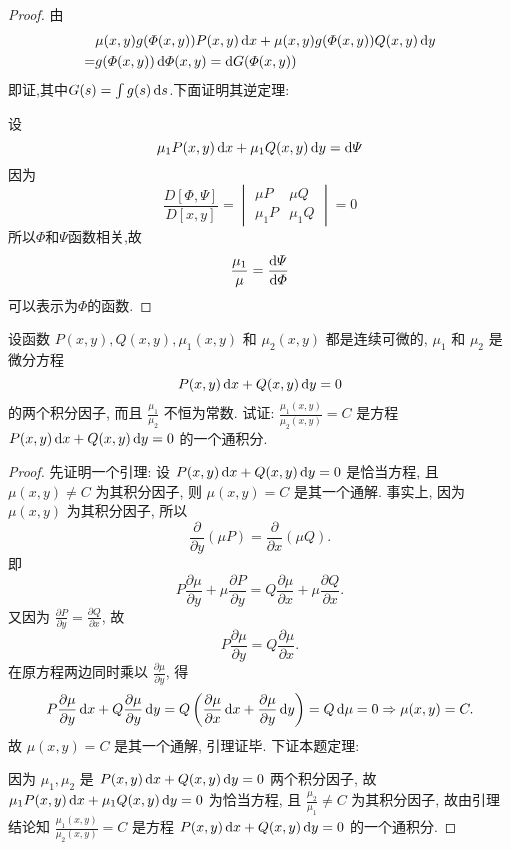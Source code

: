 \begin{proof}
由
\[\begin{split}
&\mu(x,y)g(\varPhi(x,y))P(x,y)\mathop{}\!\mathrm{d} x+\mu(x,y)g(\varPhi(x,y))Q(x,y)\mathop{}\!\mathrm{d} y\\
=&g(\varPhi(x,y))\mathop{}\!\mathrm{d}\varPhi(x,y)=\mathop{}\!\mathrm{d} G(\varPhi(x,y))
\end{split}\]
即证,其中$G(s)=\int g(s)\mathop{}\!\mathrm{d} s$.下面证明其逆定理:

设
\[\mu_1P(x,y)\mathop{}\!\mathrm{d} x+\mu_1Q(x,y)\mathop{}\!\mathrm{d} y=\mathop{}\!\mathrm{d}\varPsi\]
因为
\[\frac{D[\varPhi,\varPsi]}{D[x,y]}=
\begin{vmatrix}\mu P&\mu Q\\\mu_1P&\mu_1Q\end{vmatrix}=0\]
所以$\varPhi$和$\varPsi$函数相关,故 
\[\frac{\mu_1}{\mu}=\frac{\mathop{}\!\mathrm{d}\varPsi}{\mathop{}\!\mathrm{d}\varPhi}\]
可以表示为$\varPhi$的函数.
\end{proof}



\begin{exercise}
  设函数 $P(x,y),Q(x,y),\mu_1(x,y)$ 和 $\mu_2(x,y)$ 都是连续可微的, $\mu_1$ 和 $\mu_2$ 是微分方程
  \[P(x,y)\mathop{}\!\mathrm{d} x+Q(x,y)\mathop{}\!\mathrm{d} y=0\]
  的两个积分因子, 而且 $\frac{\mu_1}{\mu_2}$ 不恒为常数.
  试证: $\frac{\mu_1(x,y)}{\mu_2(x,y)}=C$ 是方程 $P(x,y)\mathop{}\!\mathrm{d} x+Q(x,y)\mathop{}\!\mathrm{d} y=0$ 的一个通积分.
\end{exercise}

\begin{proof}
  先证明一个引理: 设 $P(x,y)\mathop{}\!\mathrm{d} x+Q(x,y)\mathop{}\!\mathrm{d} y=0$ 是恰当方程,
  且 $\mu(x,y)\neq C$ 为其积分因子, 则 $\mu(x,y)=C$ 是其一个通解. 事实上,
  因为 $\mu(x,y)$ 为其积分因子, 所以
  \[\frac{\partial}{\partial y}(\mu P)=\frac{\partial}{\partial x}(\mu Q).\]
  即
  \[P\frac{\partial\mu}{\partial y}+\mu\frac{\partial P}{\partial y}
    = Q\frac{\partial\mu}{\partial x}+\mu\frac{\partial Q}{\partial x}.\]
  又因为 $\frac{\partial P}{\partial y}=\frac{\partial Q}{\partial x}$, 故
  \[P\frac{\partial\mu}{\partial y}=Q\frac{\partial\mu}{\partial x}.\]
  在原方程两边同时乘以 $\frac{\partial\mu}{\partial y}$, 得
  \[P\frac{\partial\mu}{\partial y}\mathop{}\!\mathrm{d} x+Q\frac{\partial\mu}{\partial y}\mathop{}\!\mathrm{d} y
    = Q\left(\frac{\partial\mu}{\partial x}\mathop{}\!\mathrm{d} x+\frac{\partial\mu}{\partial y}\mathop{}\!\mathrm{d} y\right)
    = Q\mathop{}\!\mathrm{d}\mu=0\Rightarrow\mu(x,y)=C.\]
  故 $\mu(x,y)=C$ 是其一个通解, 引理证毕. 下证本题定理:

  因为 $\mu_1,\mu_2$ 是 $P(x,y)\mathop{}\!\mathrm{d} x+Q(x,y)\mathop{}\!\mathrm{d} y=0$ 两个积分因子,
  故 $\mu_1P(x,y)\mathop{}\!\mathrm{d} x+\mu_1Q(x,y)\mathop{}\!\mathrm{d} y=0$ 为恰当方程,
  且 $\frac{\mu_2}{\mu_1}\neq C$ 为其积分因子,
  故由引理结论知 $\frac{\mu_1(x,y)}{\mu_2(x,y)}=C$ 是方程 $P(x,y)\mathop{}\!\mathrm{d} x+Q(x,y)\mathop{}\!\mathrm{d} y=0$ 的一个通积分.
\end{proof}



